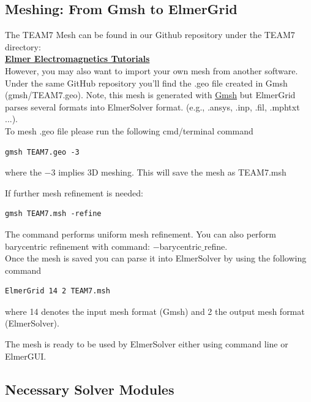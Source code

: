  \clearpage
 \subsection*{Meshing: From Gmsh to ElmerGrid} 
 
 The TEAM7 Mesh can be found in our Github repository under the TEAM7 directory: \\
 \href{https://github.com/ElmerCSC/elmer-elmag}{\textbf{Elmer Electromagnetics Tutorials}}  \\
 
 \noindent However,  you may also want to import your own mesh from another software.  Under the same GitHub repository you'll find the .geo file created in Gmsh (gmsh/TEAM7.geo).  Note,  this mesh is generated with \href{http://gmsh.info}{Gmsh} but ElmerGrid parses several formats into ElmerSolver format. (e.g., .ansys, .inp, .fil, .mphtxt ...). \\
 
\noindent To mesh .geo file please run the following cmd/terminal command

\begin{verbatim}
gmsh TEAM7.geo -3
\end{verbatim}

\noindent where the $-$3 implies 3D meshing. This will save the mesh as TEAM7.msh

\noindent If further mesh refinement is needed:

\begin{verbatim}
gmsh TEAM7.msh -refine
\end{verbatim}

\noindent The command performs uniform mesh refinement. You can also perform barycentric refinement with command: $-$barycentric$\_$refine. \\
 
\noindent Once the mesh is saved you can parse it into ElmerSolver by using the following command

\begin{verbatim}
ElmerGrid 14 2 TEAM7.msh
\end{verbatim}

\noindent where 14 denotes the input mesh format (Gmsh) and 2 the output mesh format (ElmerSolver).  

\noindent The mesh is ready to be used by ElmerSolver either using command line or ElmerGUI.
 
 
 
\subsection*{Necessary Solver Modules} 
 
